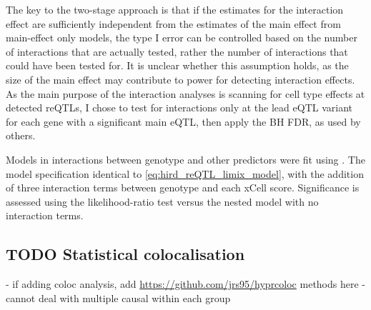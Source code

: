%
%
The key to the two-stage approach is that if the estimates for the interaction effect are sufficiently independent from the estimates of the main effect from main-effect only models,
the type I error can be controlled based on the number of interactions that are actually tested, rather the number of interactions that could have been tested for\autocite{kooperberg2008IncreasingPowerIdentifying,peters2016InsightGenotypePhenotypeAssociations}.
It is unclear whether this assumption holds, as the size of the main effect may contribute to power for detecting interaction effects.
As the main purpose of the interaction analyses is scanning for cell type effects at detected \glspl{reQTL},
I chose to test for interactions only at the lead \gls{eQTL} variant for each gene with a significant main \gls{eQTL},
then apply the \gls{BH} \gls{FDR}, as used by others\autocite{peters2016InsightGenotypePhenotypeAssociations,kim-hellmuth2017GeneticRegulatoryEffects}.

Models in interactions between genotype and other predictors were fit using .
The model specification identical to \autoref{eq:hird_reQTL_limix_model}, with the addition of three interaction terms between genotype and each xCell score.
Significance is assessed using the likelihood-ratio test versus the nested model with no interaction terms.

\subsection{TODO Statistical colocalisation}

%
- if adding coloc analysis, add \url{https://github.com/jrs95/hyprcoloc} methods here
- cannot deal with multiple causal within each group

